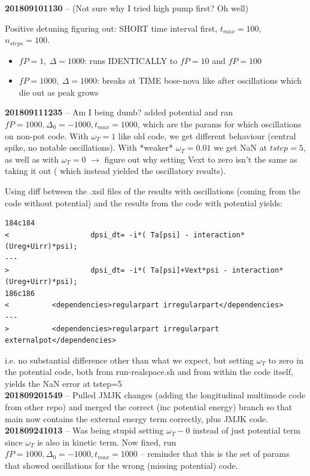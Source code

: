 \documentclass[a4paper,nobalancelastpage]{revtex4-1}
\newcommand{\mmtitle}[1]{\textcolor{multimode}{\textbf{#1}}}
\begin{document}
\mmtitle{201809101130} -- (Not sure why I tried high pump first? Oh well)

Positive detuning figuring out: SHORT time interval first, $t_{max}=100$, $n_{steps}=100$.
\begin{itemize}
\item $fP=1, \ \Delta=1000$: runs IDENTICALLY to $fP=10$ and $fP=100$
\item $fP=1000, \ \Delta=1000$: breaks at TIME bose-nova like after oscillations which die out as peak grows
\end{itemize}

\mmtitle{201809111235} -- Am I being dumb? added potential and ran $fP=1000, \Delta_0=-1000, t_{max}=1000$, which are the params for which oscillations on non-pot code. With $\omega_{T}=1$ like old code, we get different behaviour (central spike, no notable oscillations). With *weaker* $\omega_{T}=0.01$ we get NaN at $tstep=5$, as well as with $\omega_T=0$ $\rightarrow$ figure out why setting Vext to zero isn't the same as taking it out ( which instead yielded the oscillatory results).

Using diff between the .xsil files of the results with oscillations (coming from the code without potential) and the results from the code with potential yields:

\begin{lstlisting}
184c184
<                   dpsi_dt= -i*( Ta[psi] - interaction*(Ureg+Uirr)*psi);
---
>                   dpsi_dt= -i*( Ta[psi]+Vext*psi - interaction*(Ureg+Uirr)*psi);
186c186
<          <dependencies>regularpart irregularpart</dependencies>
---
>          <dependencies>regularpart irregularpart externalpot</dependencies>
\end{lstlisting}

i.e. no substantial difference other than what we expect, but setting $\omega_{T}$ to zero in the potential code, both from run-realspace.sh and from within the code itself, yields the NaN error at tstep=5\\

\mmtitle{201809201549} -- Pulled JMJK changes (adding the longitudinal multimode code from other repo) and merged the correct (inc potential energy) branch so that main now contains the external energy term correctly, plus JMJK code.\\

\mmtitle{201809241013} -- Was being stupid setting $\omega_T-0$ instead of just potential term since $\omega_T$ is also in kinetic term. Now fixed, run $fP=1000, \Delta_0=-1000, t_{max}=1000$ -- reminder that this is the set of params that showed oscillations for the wrong (missing potential) code.\\
\end{document}
